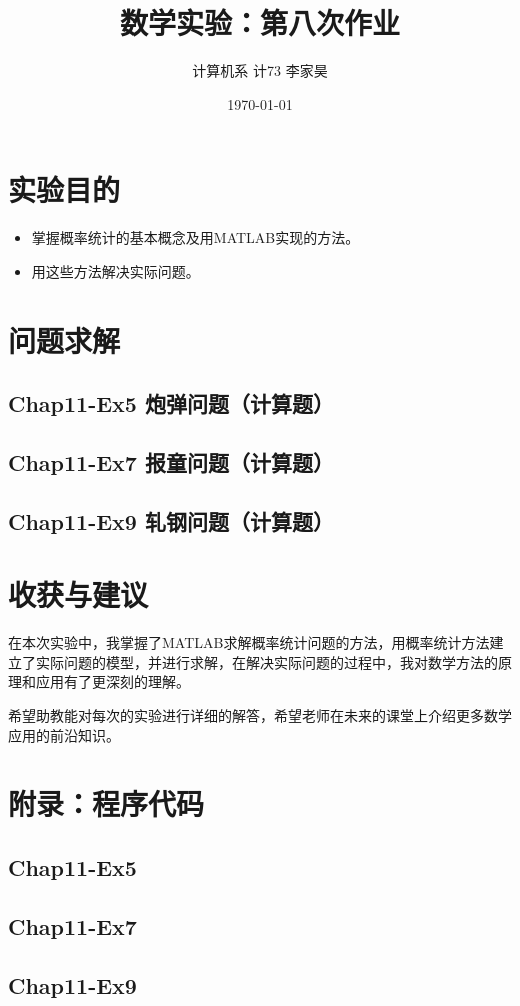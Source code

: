 \documentclass[12pt,a4paper]{article}
\title{数学实验：第八次作业}
\author{计算机系 \quad 计73 \quad 2017011620 \quad 李家昊}
\date{\today}
\begin{document}
\maketitle

\section{实验目的}

\begin{itemize}
    \item 掌握概率统计的基本概念及用MATLAB实现的方法。
    \item 用这些方法解决实际问题。
\end{itemize}

\section{问题求解}

\subsection{Chap11-Ex5 炮弹问题（计算题）}



\subsection{Chap11-Ex7 报童问题（计算题）}



\subsection{Chap11-Ex9 轧钢问题（计算题）}



\section{收获与建议}

在本次实验中，我掌握了MATLAB求解概率统计问题的方法，用概率统计方法建立了实际问题的模型，并进行求解，在解决实际问题的过程中，我对数学方法的原理和应用有了更深刻的理解。

希望助教能对每次的实验进行详细的解答，希望老师在未来的课堂上介绍更多数学应用的前沿知识。

\section{附录：程序代码}

\subsection{Chap11-Ex5}\label{sec:ex5_code}



\subsection{Chap11-Ex7}\label{sec:ex7_code}



\subsection{Chap11-Ex9}\label{sec:ex9_code}


\end{document}

